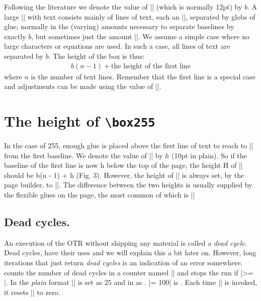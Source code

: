 Following the literature we denote the value of |\baselineskip| (which is normally 12pt) by $b$. 
A
large |\vbox| with text consists mainly of lines of
text, each an |\hbox|, separated by globs of glue,
normally in the (varying) amounts necessary to
separate baselines by exactly $b$, but sometimes just
the amount |\lineskip|. We assume a simple case
where no large characters or equations are used. In
such a case, all lines of text are separated by $b$. The
height of the box is thus:
\begin{gather}
b(n - 1) + \text{the height of the first line}
\end{gather}
where $n$ is the number of text lines. Remember that the first line is a special case and adjustments can be made using the value of |\topskip|.

\section{The height of \texttt{\textbackslash box255}}

In the case of 255,
enough glue is placed above the first line of text
to reach to |\topskip| from the first baseline. We
denote the value of |\topskip| by $h$ (10pt in plain).
So if the baseline of the first line is now h below the
top of the page, the height H of || should
be b(n - 1) + h (Fig. 3). However, the height of
|| is always set, by the page builder, to
|\vsize|. The difference between the two heights is
usually supplied by the flexible glues on the page,
the most common of which is |\parskip|

\begin{comment}
\begin{figure}[htp]
\texttt{[image: ./graphics/heightofpagebox.jpg]}
\end{figure}
\end{comment}

\subsection{Dead cycles.} An execution of the OTR without shipping any material is called a \emph{dead cycle}. Dead cycles, have their uses and we will explain this a bit later on. However, long iterations that just return \textit{dead cycles} is an indication of an error somewhere. \tex counts the number of dead cycles in a counter named |\deadcycles| and stops the run if |\deadcycles >= \maxdeadcycles|.  In the \textit{plain} format |\maxdeadcycles| is set as 25 and in \latex as \the\deadcycles. |\maxdeadcycles = 100| is \the\maxdeadcycles. Each time |\shipout| is invoked, it resets |\deadcycles| to zero.

